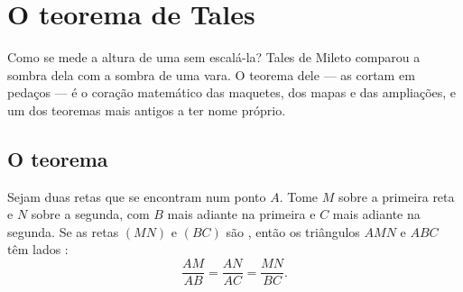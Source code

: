 \chapter{O teorema de Tales}\label{ch:g9:thales}

Como se mede a altura de uma  sem escalá-la? Tales de Mileto
comparou a sombra dela com a sombra de uma vara. O teorema dele --- as
 cortam  em pedaços  --- é o
coração matemático das maquetes, dos mapas e das ampliações, e um dos
teoremas mais antigos a ter nome próprio.

\section{O teorema}

\begin{theorem}[Tales]\label{thm:g9:thales:direct}
Sejam duas retas que se encontram num ponto $A$. Tome $M$ sobre a
primeira reta e $N$ sobre a segunda, com $B$ mais adiante na primeira e
$C$ mais adiante na segunda. Se as retas $(MN)$ e $(BC)$ são
\emph{}, então os triângulos $AMN$ e $ABC$ têm lados
:
\[
\frac{AM}{AB} = \frac{AN}{AC} = \frac{MN}{BC}.
\]
\end{theorem}
\admitted

